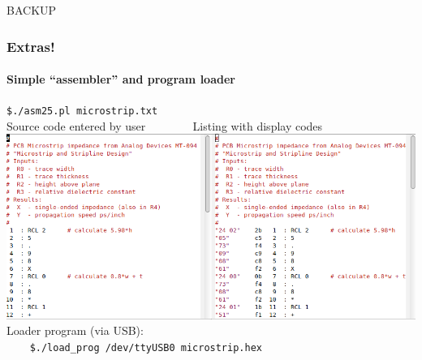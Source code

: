\documentclass{beamer}
\newcommand{\tred}[1]{\textcolor{my-red}{#1}}
\newcommand{\tblue}[1]{\textcolor{my-blue}{#1}}
\begin{document}
\begin{frame}
        BACKUP
\end{frame}

\begin{frame}
  \frametitle{Extras!}
  \framesubtitle{Simple ``assembler'' and program loader}
  \vskip -0.3in
  \tred{\scriptsize \tt \$./asm25.pl microstrip.txt} \\
  Source code entered by user ~~~~~~~ Listing with display codes \\
  \includegraphics[width=\textwidth]{figs/microstrip-list.png} \\
  \vskip 0.1in
  \scriptsize
  \tblue{Loader program (via USB):}\\
  \tred{\tt ~~~ \$./load\_prog /dev/ttyUSB0 microstrip.hex}
\end{frame}
\end{document}
